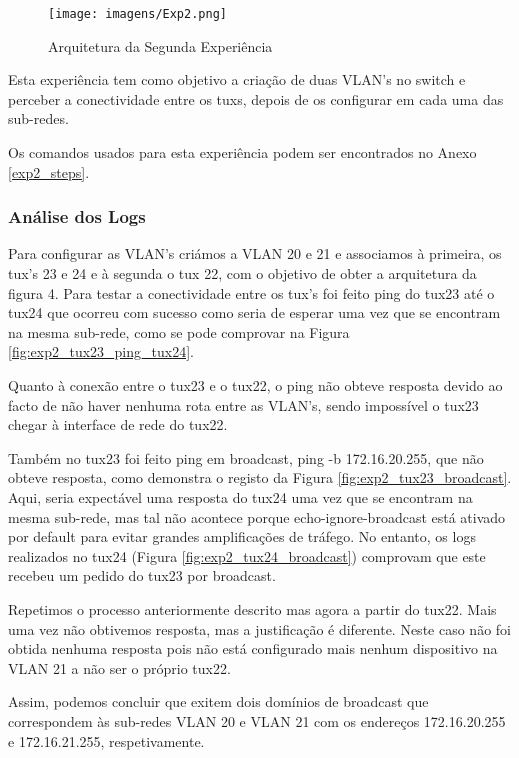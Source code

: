 \begin{figure}[h!]
\centering
\texttt{[image: imagens/Exp2.png]}
\caption{Arquitetura da Segunda Experiência}
\label{fig:exp2}
\end{figure}

Esta experiência tem como objetivo a criação de duas VLAN's no switch e perceber a conectividade entre os tuxs, depois de os configurar em cada uma das sub-redes.

Os comandos usados para esta experiência podem ser encontrados no Anexo \ref{exp2_steps}.

\subsubsection{Análise dos Logs}

Para configurar as VLAN's criámos a VLAN 20 e 21 e associamos à primeira, os tux's 23 e 24 e à segunda o tux 22, com o objetivo de obter a arquitetura da figura 4.
Para testar a conectividade entre os tux's foi feito ping do tux23 até o tux24 que ocorreu com sucesso como seria de esperar uma vez que se encontram na mesma sub-rede, como se pode comprovar na Figura \ref{fig:exp2_tux23_ping_tux24}.

Quanto à conexão entre o tux23 e o tux22, o ping não obteve resposta devido ao facto de não haver nenhuma rota entre as VLAN's, sendo impossível o tux23 chegar à interface de rede do tux22.

Também no tux23 foi feito ping em broadcast, ping -b 172.16.20.255, que não obteve resposta, como demonstra o registo da Figura \ref{fig:exp2_tux23_broadcast}. Aqui, seria expectável uma resposta do tux24 uma vez que se encontram na mesma sub-rede, mas tal não acontece porque echo-ignore-broadcast está ativado por default para evitar grandes amplificações de tráfego. No entanto, os logs realizados no tux24 (Figura \ref{fig:exp2_tux24_broadcast}) comprovam que este recebeu um pedido do tux23 por broadcast.

Repetimos o processo anteriormente descrito mas agora a partir do tux22. Mais uma vez não obtivemos resposta, mas a justificação é diferente. Neste caso não foi obtida nenhuma resposta pois não está configurado mais nenhum dispositivo na VLAN 21 a não ser o próprio tux22. 

Assim, podemos concluir que exitem dois domínios de broadcast que correspondem às sub-redes VLAN 20 e VLAN 21 com os endereços 172.16.20.255 e 172.16.21.255, respetivamente.
